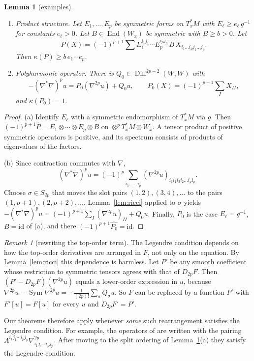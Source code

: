 \documentclass[11pt,reqno]{amsart}
\newtheorem{lemma}[theorem]{Lemma}
\theoremstyle{definition}
\theoremstyle{remark}
\newtheorem{remark}[theorem]{Remark}
\newcommand{\Diff}{\operatorname{Diff}}
\newcommand{\End}{\operatorname{End}}
\newcommand{\id}{\mathrm{id}}
\newcommand{\Lap}{\nabla^{*}\nabla}
\newcommand{\hatP}{\widehat{P}}
\newcommand{\lean}[1]{}
\newcommand{\uses}[1]{}
\numberwithin{equation}{section}
\begin{document}
\begin{lemma}[examples]\label{lem:legendre-examples}
\lean{ShortTime.legendre_product, ShortTime.isDiffOp_lapIter_sub_modelTop, ShortTime.legendreAt_modelTop, ShortTime.polyTrace, ShortTime.legendreAt_polyTrace, ShortTime.productCLM, ShortTime.mmPairing}
\uses{def:legendre, lem:ricci}
\begin{enumerate}[label=(\alph*),nosep]
\item \emph{Product structure.} Let $E_1,\dots,E_p$ be symmetric forms on $T^*_xM$ with
  $E_\ell\ge e_\ell\,g^{-1}$ for constants $e_\ell>0$. Let $B\in\End(W_x)$ be symmetric with
  $B\ge b>0$. Let
  \[
    P(X)=(-1)^{p+1}\sum E_1^{i_1j_1}\cdots E_p^{i_pj_p}\,B\,X_{i_1\dots i_pj_1\dots j_p}.
  \]
  Then $\kappa(P)\ge b\,e_1\cdots e_p$.
\item \emph{Polyharmonic operator.} There is $Q_0\in\Diff^{2p-2}(W,W)$ with
  \[
    -(\Lap)^pu=P_0(\nabla^{2p}u)+Q_0u,\qquad
    P_0(X)=(-1)^{p+1}\sum_{I}X_{II},
  \]
  and $\kappa(P_0)=1$.
\end{enumerate}
\end{lemma}

\begin{proof}
(a) Identify $E_\ell$ with a symmetric endomorphism of $T^*_xM$ via $g$. Then
$(-1)^{p+1}\hatP=E_1\otimes\cdots\otimes E_p\otimes B$ on $\otimes^pT^*_xM\otimes W_x$. A tensor
product of positive symmetric operators is positive, and its spectrum consists of products of
eigenvalues of the factors.

(b) Since contraction commutes with $\nabla$,
\[
  (\Lap)^pu=(-1)^p\sum_{i_1,\dots,i_p}(\nabla^{2p}u)_{i_1i_1i_2i_2\dots i_pi_p}.
\]
Choose $\sigma\in S_{2p}$ that moves the slot pairs $(1,2),(3,4),\dots$ to the pairs
$(1,p{+}1),(2,p{+}2),\dots$. Lemma~\ref{lem:ricci} applied to $\sigma$ yields
$-(\Lap)^pu=(-1)^{p+1}\sum_I(\nabla^{2p}u)_{II}+Q_0u$. Finally, $P_0$ is the case $E_\ell=g^{-1}$,
$B=\id$ of (a), and there $(-1)^{p+1}\widehat{P_0}=\id$.
\end{proof}

\begin{remark}[rewriting the top-order term]\label{rem:rewrite}
The Legendre condition depends on how the top-order derivatives are arranged in $F$, not only on the
equation. By Lemma~\ref{lem:ricci} this dependence is harmless. Let $P'$ be any smooth coefficient
whose restriction to symmetric tensors agrees with that of $D_{2p}F$. Then
$(P'-D_{2p}F)(\nabla^{2p}u)$ equals a lower-order expression in $u$, because
$\nabla^{2p}u-\operatorname{Sym}\nabla^{2p}u=-\frac{1}{(2p)!}\sum_\sigma Q_\sigma u$. So $F$ can be
replaced by a function $F'$ with $F'[u]=F[u]$ for every $u$ and $D_{2p}F'=P'$.

Our theorems therefore apply whenever \emph{some} such rearrangement satisfies the Legendre
condition. For example, the operators of \cite{MM} are written with the pairing
$A^{i_1j_1\cdots i_pj_p}\nabla^{2p}_{i_1j_1\cdots i_pj_p}$. After moving to the split ordering of
Lemma~\ref{lem:legendre-examples}(a) they satisfy the Legendre condition.
\end{remark}
\end{document}
